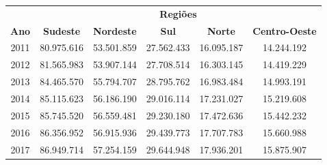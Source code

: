 \begin{table}[!ht]	
\centering
\label{estimativas}
\begin{tabular}{c|c|c|c|c|c}
\hline
& \multicolumn{5}{c}{\textbf{Regiões}} \\
\cline{2-6}
\textbf{Ano} & \textbf{Sudeste} & \textbf{Nordeste} & \textbf{Sul} & \textbf{Norte} & \textbf{Centro-Oeste} \\
\hline
2011 & 80.975.616 & 53.501.859 & 27.562.433 & 16.095.187 & 14.244.192 \\
\hline
2012 & 81.565.983 & 53.907.144 & 27.708.514 & 16.303.145 &
14.419.229 \\
\hline
2013 & 84.465.570 & 55.794.707 & 28.795.762 & 16.983.484 &
14.993.191 \\
\hline
2014 & 85.115.623 & 56.186.190 & 29.016.114 & 17.231.027 &
15.219.608 \\
\hline
2015 & 85.745.520 & 56.559.481 & 29.230.180 & 17.472.636 &
15.442.232 \\
\hline
2016 & 86.356.952 & 56.915.936 & 29.439.773 & 17.707.783 &
15.660.988 \\
\hline
2017 & 86.949.714 & 57.254.159 & 29.644.948 & 17.936.201 &
15.875.907 \\
\hline
\end{tabular}
\end{table}

